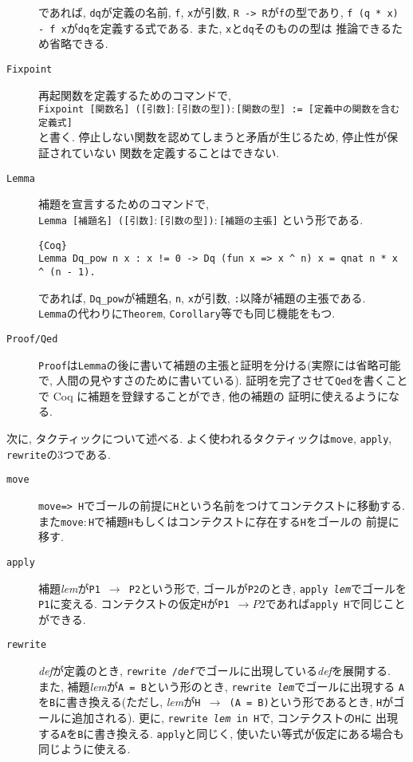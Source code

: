 \documentclass[11pt]{jsreport}
\theoremstyle{mystyle}
\newcommand{\0}{\textbf{0}}
\newcommand{\1}{\textbf{1}}
\newcommand{\2}{\textbf{2}}
\begin{document}
\begin{description}
    であれば, {\tt dq}が定義の名前, {\tt f}, {\tt x}が引数, {\tt R -> R}が{\tt f}の型であり, 
    {\tt f (q * x) - f x}が{\tt dq}を定義する式である. また, {\tt x}と{\tt dq}そのものの型は
    推論できるため省略できる. 
  \item[\tt Fixpoint]
    再起関数を定義するためのコマンドで, \\
    {\tt Fixpoint [関数名] ([引数]$\colon$[引数の型])$\colon$[関数の型] := 
    [定義中の関数を含む定義式]}\\
    と書く. 停止しない関数を認めてしまうと矛盾が生じるため, 停止性が保証されていない
    関数を定義することはできない. 
  \item[\tt Lemma]
    補題を宣言するためのコマンドで, \\
    {\tt Lemma [補題名] ([引数]$\colon$[引数の型])$\colon$[補題の主張]}
    という形である. 
    \begin{lstlisting}{Coq}
Lemma Dq_pow n x : x != 0 -> Dq (fun x => x ^ n) x = qnat n * x ^ (n - 1). \end{lstlisting}
    であれば, {\tt Dq\_pow}が補題名, {\tt n}, {\tt x}が引数, {\tt :}以降が補題の主張である. \\
    {\tt Lemma}の代わりに{\tt Theorem}, {\tt Corollary}等でも同じ機能をもつ. 
  \item[\tt Proof/Qed]
    {\tt Proof}は{\tt Lemma}の後に書いて補題の主張と証明を分ける(実際には省略可能で, 
    人間の見やすさのために書いている). 
    証明を完了させて{\tt Qed}を書くことで Coq に補題を登録することができ, 他の補題の
    証明に使えるようになる. 
\end{description}
次に, タクティックについて述べる. よく使われるタクティックは{\tt move}, {\tt apply}, {\tt rewrite}の3つである. 
\begin{description}
  \item[\tt move]
    {\tt move=> H}でゴールの前提に{\tt H}という名前をつけてコンテクストに移動する. 
    また{\tt move$\colon$H}で補題{\tt H}もしくはコンテクストに存在する{\tt H}をゴールの
    前提に移す. 
  \item[\tt apply]
    補題{\it lem}が{\tt P1 $\to$ P2}という形で, ゴールが{\tt P2}のとき, 
    {\tt apply {\it lem}}でゴールを{\tt P1}に変える. 
    コンテクストの仮定{\tt H}が{\tt P1 $\to P2$}であれば{\tt apply H}で同じことができる. 
  \item[\tt rewrite]
    {\it def}が定義のとき, {\tt rewrite /{\it def}}でゴールに出現している{\it def}を展開する. \\
    また, 補題{\it lem}が{\tt A = B}という形のとき, {\tt rewrite {\it lem}}でゴールに出現する
    {\tt A}を{\tt B}に書き換える(ただし, {\it lem}が{\tt H $\to$ (A = B)}という形であるとき, 
    {\tt H}がゴールに追加される). 更に, {\tt rewrite {\it lem} in H}で, コンテクストの{\tt H}に
    出現する{\tt A}を{\tt B}に書き換える. {\tt apply}と同じく, 使いたい等式が仮定にある場合も
    同じように使える. 
\end{description}
\end{document}

